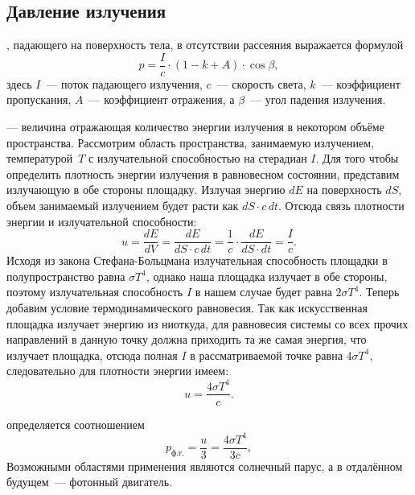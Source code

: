 \subsection{Давление излучения}
, падающего на поверхность тела, в отсутствии рассеяния выражается формулой
\begin{equation}
    p = \frac{I}{c} \cdot (1 - k + A) \cdot \cos \beta,
\end{equation}
здесь $I$~--- поток падающего излучения, $c$~--- скорость света, $k$~--- коэффициент пропускания, $A$~--- коэффициент отражения, а $\beta$~--- угол падения излучения.

 — величина отражающая количество энергии излучения в некотором объёме пространства. Рассмотрим область пространства, занимаемую излучением, температурой~$T$ с излучательной способностью на стерадиан $I$. Для того чтобы определить плотность энергии излучения в равновесном состоянии, представим излучающую в обе стороны площадку. Излучая энергию $dE$ на поверхность $dS$, объем занимаемый излучением будет расти как $dS\cdot c \, dt$. Отсюда связь плотности энергии и излучательной способности:
\begin{equation*}
	u = \frac{dE}{dV} = \frac{dE}{dS \cdot c \, dt} = \frac{1}{c} \cdot \frac{dE}{dS\cdot dt} = \frac{I}{c}.
\end{equation*}
Исходя из закона Стефана-Больцмана излучательная способность площадки в полупространство равна $\sigma T^4$, однако наша площадка излучает в обе стороны, поэтому излучательная способность $I$ в нашем случае будет равна $2 \sigma T^4$. Теперь добавим условие термодинамического равновесия. Так как искусственная площадка излучает энергию из ниоткуда, для равновесия системы со всех прочих направлений в данную точку должна приходить та же самая энергия, что излучает площадка, отсюда полная $I$ в рассматриваемой точке равна $4 \sigma T^4$, следовательно для плотности энергии имеем:
\begin{equation}
	u = \frac{4\sigma T^4}{c}.
\end{equation}

 определяется соотношением
\begin{equation}
    p_\text{ф.г.} = \frac{u}{3} = \frac{4 \sigma T^4}{3c},
\end{equation}
Возможными областями применения являются солнечный парус, а в отдалённом будущем~--- фотонный двигатель.
